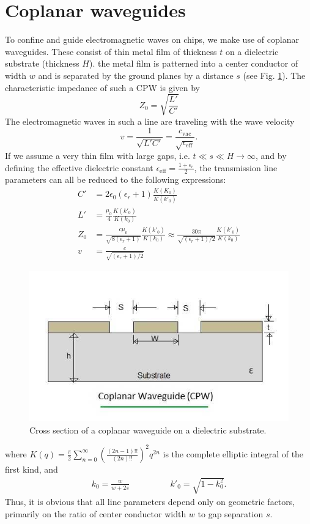 \section{Coplanar waveguides}
To confine and guide electromagnetic waves on chips, we make use of coplanar waveguides. These consist of thin metal film of thickness $t$ on a dielectric substrate (thickness $H$). the metal film is patterned into a center conductor of width $w$ and is separated by the ground planes by a distance $s$ (see Fig. \ref{fig:cpw-coplanar-waveguide}). The characteristic impedance of such a CPW is given by
\begin{equation}
Z_0 = \sqrt{\frac{L'}{C'}}
\end{equation}
The electromagnetic waves in such a line are traveling with the wave velocity \begin{equation}
v=\frac{1}{\sqrt{L'C'}}=\frac{c_\mathrm{vac}}{\sqrt{\epsilon_\mathrm{eff}}}.
\end{equation}
If we assume a very thin film with large gaps, i.e. $t \ll s \ll H \rightarrow \infty$, and by defining the effective dielectric constant $\epsilon_\mathrm{eff} = \frac{1+\epsilon_r}{2}$, the transmission line parameters can all be reduced to the following expressions:
\begin{align}
C' &= 2\epsilon_0(\epsilon_r+1)\frac{K(K_0)}{K(k'_0)} \\%
L' &= \frac{\mu_0}{4}\frac{K(k'_0)}{K(k_0)} \\%
Z_0 &= \frac{c\mu_0}{\sqrt{8(\epsilon_r+1)}}\frac{K(k'_0)}{K(k_0)}\approx \frac{30\pi}{\sqrt{(\epsilon_r+1)/2}}\frac{K(k'_0)}{K(k_0)} \\%
v &= \frac{c}{\sqrt{(\epsilon_r+1)/2}}
\end{align}
\begin{figure}
	\centering
	\includegraphics[width=0.3\linewidth]{chapter-theory/figs-RF/CPW-Coplanar-Waveguide.jpg}
	\caption{Cross section of a coplanar waveguide on a dielectric substrate.}
	\label{fig:cpw-coplanar-waveguide}
\end{figure}
where $K(q) = \frac{\pi}{2}\sum_{n=0}^{\infty}\left(\frac{(2n-1)!!}{(2n)!!}\right)^2 q^{2n}$ is the complete elliptic integral of the first kind, and
\begin{align}
k_0 = \frac{w}{w+2s} \hspace{2cm} k'_0 = \sqrt{1-k_0^2}.
\end{align}
Thus, it is obvious that all line parameters depend only on geometric factors, primarily on the ratio of center conductor width $w$ to gap separation $s$.


